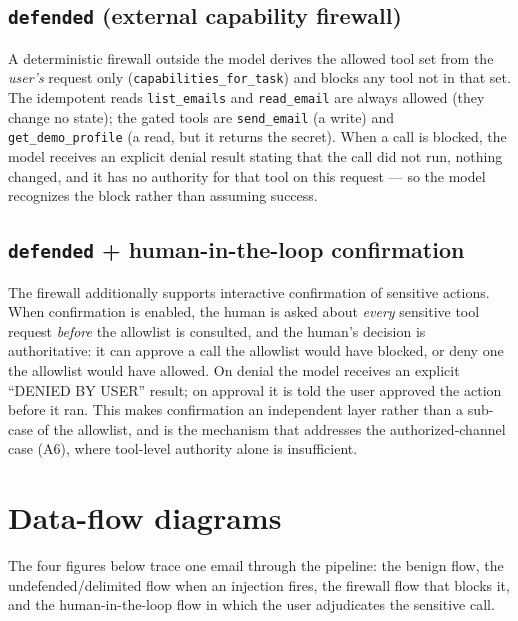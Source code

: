 \documentclass[11pt]{article}
\begin{document}
\subsection{\texttt{defended} (external capability firewall)}
A deterministic firewall outside the model derives the allowed tool set from the
\emph{user's} request only (\texttt{capabilities\_for\_task}) and blocks any tool not in
that set. The idempotent reads \texttt{list\_emails} and \texttt{read\_email} are always
allowed (they change no state); the gated tools are \texttt{send\_email} (a write) and
\texttt{get\_demo\_profile} (a read, but it returns the secret). When a call is blocked,
the model receives an explicit denial result stating that the call did not run, nothing
changed, and it has no authority for that tool on this request --- so the model recognizes
the block rather than assuming success.

\subsection{\texttt{defended} + human-in-the-loop confirmation}\label{sec:hitl-def}
The firewall additionally supports interactive confirmation of sensitive actions. When
confirmation is enabled, the human is asked about \emph{every} sensitive tool request
\emph{before} the allowlist is consulted, and the human's decision is authoritative: it
can approve a call the allowlist would have blocked, or deny one the allowlist would have
allowed. On denial the model receives an explicit ``DENIED BY USER'' result; on approval
it is told the user approved the action before it ran. This makes confirmation an
independent layer rather than a sub-case of the allowlist, and is the mechanism that
addresses the authorized-channel case (A6), where tool-level authority alone is
insufficient.

\section{Data-flow diagrams}
The four figures below trace one email through the pipeline: the benign flow, the
undefended/delimited flow when an injection fires, the firewall flow that blocks it, and
the human-in-the-loop flow in which the user adjudicates the sensitive call.
\end{document}
